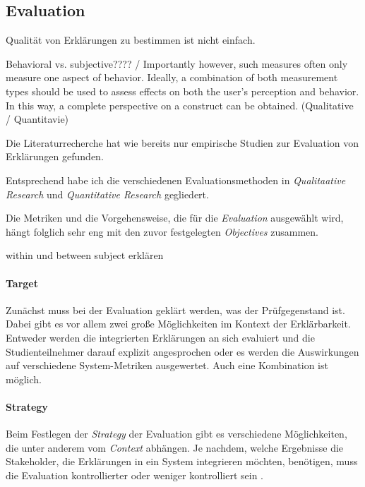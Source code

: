 \subsection{Evaluation}
\label{sec:model_evaluation_description}

Qualität von Erklärungen zu bestimmen ist nicht einfach.

Behavioral vs. subjective???? / \glqq Importantly however, such measures often only measure one aspect of behavior. Ideally, a combination of both measurement types should be used to assess effects on both the user’s perception and behavior. In this way, a complete perspective on a construct can be obtained.\grqq{} (Qualitative / Quantitavie) \cite{waa_evaluating_2021}

Die Literaturrecherche hat wie bereits \cite{nunes_systematic_2017} nur empirische Studien zur Evaluation von Erklärungen gefunden.

Entsprechend \cite{wohlin2012experimentation} habe ich die verschiedenen Evaluationsmethoden in \textit{Qualitaative Research} und \textit{Quantitative Research} gegliedert.

Die Metriken und die Vorgehensweise, die für die \textit{Evaluation} ausgewählt wird, hängt folglich sehr eng mit den zuvor festgelegten \textit{Objectives} zusammen.

within und between subject erklären

\paragraph{Target} Zunächst muss bei der Evaluation geklärt werden, was der Prüfgegenstand ist. Dabei gibt es vor allem zwei große Möglichkeiten im Kontext der Erklärbarkeit. Entweder werden die integrierten Erklärungen an sich evaluiert und die Studienteilnehmer darauf explizit angesprochen oder es werden die Auswirkungen auf verschiedene System-Metriken ausgewertet. Auch eine Kombination ist möglich.

\paragraph{Strategy} Beim Festlegen der \textit{Strategy} der Evaluation gibt es verschiedene Möglichkeiten, die unter anderem vom \textit{Context} abhängen. Je nachdem, welche Ergebnisse die Stakeholder, die Erklärungen in ein System integrieren möchten, benötigen, muss die Evaluation kontrollierter oder weniger kontrolliert sein \cite[vgl.][]{wohlin2012experimentation}.


